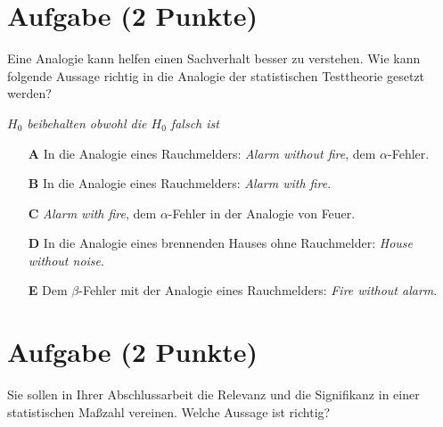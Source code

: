 \documentclass[a4paper, 9pt]{scrartcl}\usepackage[]{graphicx}\usepackage[]{xcolor}
\begin{document}

\section{Aufgabe \hfill (2 Punkte)}



Eine Analogie kann helfen einen Sachverhalt besser zu verstehen. Wie kann folgende Aussage richtig in die Analogie der statistischen Testtheorie gesetzt werden?

\begin{center}
\textit{$H_0$ beibehalten obwohl die $H_0$ falsch ist}
\end{center}



\begin{enumerate}
\item [\textbf{A} \msquare] In die Analogie eines Rauchmelders: \textit{Alarm without fire}, dem $\alpha$-Fehler.
\item [\textbf{B} \msquare] In die Analogie eines Rauchmelders: \textit{Alarm with fire}.
\item [\textbf{C} \msquare] \textit{Alarm with fire}, dem $\alpha$-Fehler in der Analogie von Feuer.
\item [\textbf{D} \msquare] In die Analogie eines brennenden Hauses ohne Rauchmelder: \textit{House without noise}.
\item [\textbf{E} \msquare] Dem $\beta$-Fehler mit der Analogie eines Rauchmelders: \textit{Fire without alarm}.
\end{enumerate}

\section{Aufgabe \hfill (2 Punkte)}



Sie sollen in Ihrer Abschlussarbeit die Relevanz und die Signifikanz in einer statistischen Maßzahl vereinen. Welche Aussage ist richtig?
\end{document}
